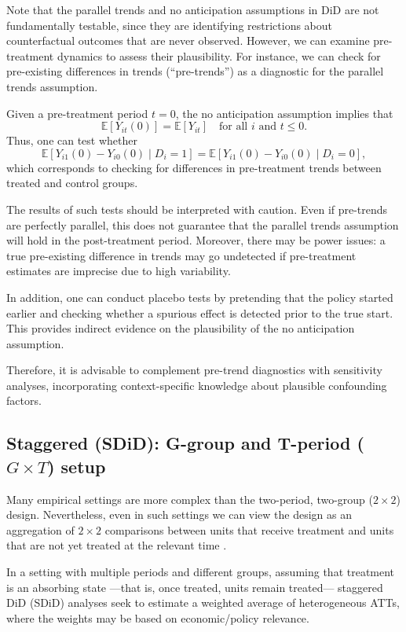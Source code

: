 Note that the parallel trends and no anticipation assumptions in DiD are not fundamentally testable, since they are identifying restrictions about counterfactual outcomes that are never observed. However, we can examine pre-treatment dynamics to assess their plausibility. For instance, we can check for pre-existing differences in trends (``pre-trends'') as a diagnostic for the parallel trends assumption.  

Given a pre-treatment period $t=0$, the no anticipation assumption implies that 
\[
\mathbb{E}[Y_{it}(0)] = \mathbb{E}[Y_{it}] \quad \text{for all } i \text{ and } t \leq 0.
\]
Thus, one can test whether
\begin{equation}
	\mathbb{E}[Y_{i1}(0) - Y_{i0}(0) \mid D_i = 1] 
	= \mathbb{E}[Y_{i1}(0) - Y_{i0}(0) \mid D_i = 0],
\end{equation}
which corresponds to checking for differences in pre-treatment trends between treated and control groups.

The results of such tests should be interpreted with caution. Even if pre-trends are perfectly parallel, this does not guarantee that the parallel trends assumption will hold in the post-treatment period. Moreover, there may be power issues: a true pre-existing difference in trends may go undetected if pre-treatment estimates are imprecise due to high variability.

In addition, one can conduct placebo tests by pretending that the policy started earlier and checking whether a spurious effect is detected prior to the true start. This provides indirect evidence on the plausibility of the no anticipation assumption.

Therefore, it is advisable to complement pre-trend diagnostics with sensitivity analyses, incorporating context-specific knowledge about plausible confounding factors.

\subsection{Staggered (SDiD): G-group and T-period ($G\times T$) setup}\label{chap12_52}

Many empirical settings are more complex than the two-period, two-group ($2\times 2$) design. Nevertheless, even in such settings we can view the design as an aggregation of $2\times 2$ comparisons between units that receive treatment and units that are not yet treated at the relevant time \cite{baker2025did_guide}.

In a setting with multiple periods and different groups, assuming that treatment is an absorbing state —that is, once treated, units remain treated— staggered DiD (SDiD) analyses seek to estimate a weighted average of heterogeneous ATTs, where the weights may be based on economic/policy relevance. 

